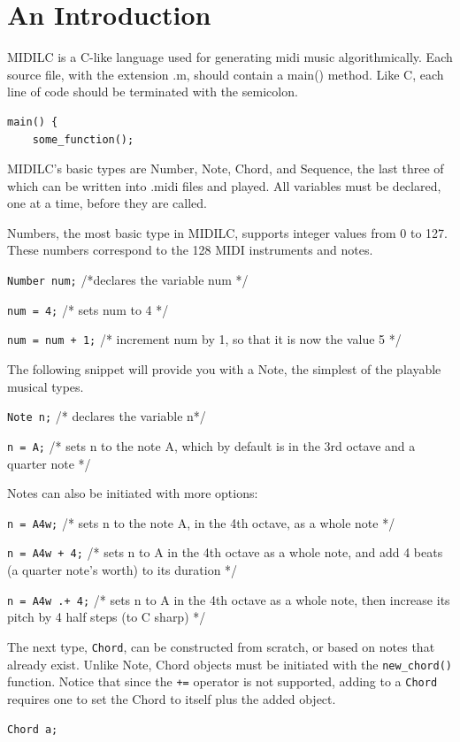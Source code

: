 \documentclass[12pt,A4]{book}
\begin{document}
\section{An Introduction}
MIDILC is a C-like language used for generating midi music algorithmically. Each source file, with the extension .m, should contain a main() method. Like C, each line of code should be terminated with the semicolon.
\begin{verbatim}
main() {
    some_function();
\end{verbatim}

MIDILC’s basic types are Number, Note, Chord, and Sequence, the last three of which can be written into .midi files and played. All variables must be declared, one at a time, before they are called.

Numbers, the most basic type in MIDILC, supports integer values from 0 to 127. These numbers correspond to the 128 MIDI instruments and notes.

\verb|Number num;| /*declares the variable num */

\verb|num = 4;| /* sets num to 4 */

\verb|num = num + 1;| /* increment num by 1, so that it is now the value 5 */

The following snippet will provide you with a Note, the simplest of the playable musical types.

\verb|Note n;| /* declares the variable n*/

\verb|n = A;| /* sets n to the note A, which by default is in the 3rd octave and a quarter note */

Notes can also be initiated with more options:

\verb|n = A4w;| /* sets n to the note A, in the 4th octave, as a whole note */

\verb|n = A4w + 4;| /* sets n to A in the 4th octave as a whole note, and add 4 beats (a quarter note’s worth) to its duration */

\verb|n = A4w .+ 4;| /* sets n to A in the 4th octave as a whole note, then increase its pitch by 4 half steps (to C sharp) */

The next type, \verb|Chord|, can be constructed from scratch, or based on notes that already exist. Unlike Note, Chord objects must be initiated with the \verb|new_chord()| function. Notice that since the \verb|+=| operator is not supported, adding to a \verb|Chord| requires one to set the Chord to itself plus the added object.

\verb|Chord a;|
\end{document}
